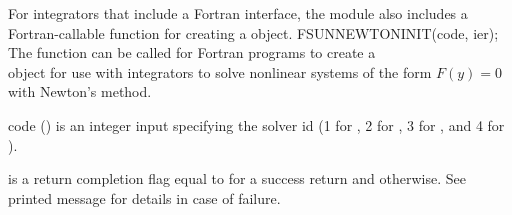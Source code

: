 For {\sundials} integrators that include a Fortran interface, the
{\sunnonlinsolnewton} module also includes a Fortran-callable
function for creating a  object.
{
  FSUNNEWTONINIT(code, ier);
}
{
  The function  can be called for Fortran programs
  to create a\\
   object for use with {\sundials}
  integrators to solve nonlinear systems of the form $F(y) = 0$ with
  Newton's method.
}
{
  \begin{args}[code]
  \item[code] ()
    is an integer input specifying the solver id (1 for {\cvode}, 2
    for {\ida}, 3 for {\kinsol}, and 4 for {\arkode}).
  \end{args}
}
{
   is a return completion flag equal to  for a success
  return and  otherwise. See printed message for details in case
  of failure.
}
{}
